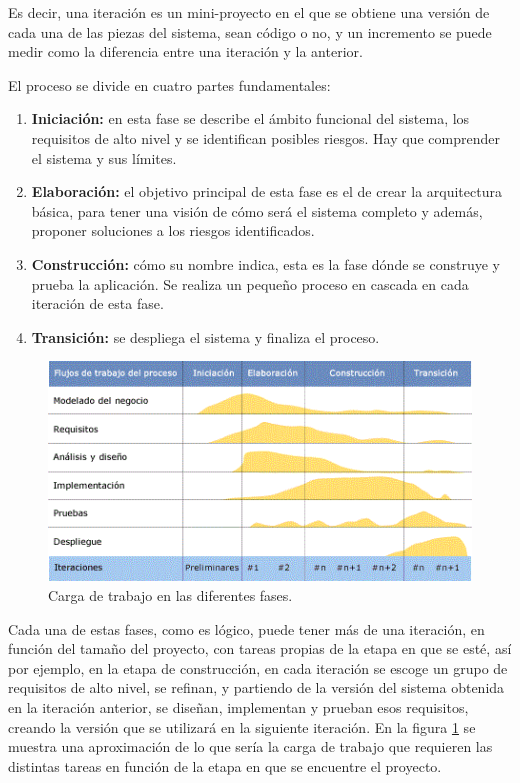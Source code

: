 Es decir, una iteración es un mini-proyecto en el que se obtiene una versión de cada una de las piezas del sistema, sean código o no, y un incremento se puede medir como la diferencia entre una iteración y la anterior.
\newline

El proceso se divide en cuatro partes fundamentales:

\begin{enumerate}

	\item \textbf{Iniciación:} en esta fase se describe el ámbito funcional del sistema, los requisitos de alto nivel y se identifican posibles riesgos. Hay que comprender el sistema y sus límites.

	\item \textbf{Elaboración:} el objetivo principal de esta fase es el de crear la arquitectura básica, para tener una visión de cómo será el sistema completo y además, proponer soluciones a los riesgos identificados.

	\item \textbf{Construcción:} cómo su nombre indica, esta es la fase dónde se construye y prueba la aplicación. Se realiza un pequeño proceso en cascada en cada iteración de esta fase.

	\item \textbf{Transición:} se despliega el sistema y finaliza el proceso.

\end{enumerate}


\begin{figure}[!h]
    \centering
    \includegraphics[]{planificacion/trabajoFases}
    \caption{Carga de trabajo en las diferentes fases.\cite{RUP:2003}}
    \label{fig:planificacion:trabajoFases}
\end{figure}

Cada una de estas fases, como es lógico, puede tener más de una iteración, en función del tamaño del proyecto, con tareas propias de la etapa en que se esté, así por ejemplo, en la etapa de construcción, en cada iteración se escoge un grupo de requisitos de alto nivel, se refinan, y partiendo de la versión del sistema obtenida en la iteración anterior, se diseñan, implementan y prueban esos requisitos, creando la versión que se utilizará en la siguiente iteración. En la figura \ref{fig:planificacion:trabajoFases} se muestra una aproximación de lo que sería la carga de trabajo que requieren las distintas tareas en función de la etapa en que se encuentre el proyecto.
\newline

